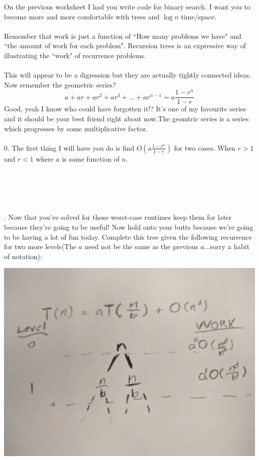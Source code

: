\documentclass[12pt]{article}
\begin{document}
\newpage
\noindent On the previous worksheet I had you write code for binary search. I want you to become more and more comfortable with trees and $\log{n}$ time/space. \\\\
Remember that work is just a function of ``How many problems we have" and ``the amount of work for each problem". Recursion trees is an expressive way of illustrating the ``work" of recurrence problems.\\\\
This will appear to be a digression but they are actually tightly connected ideas. Now remember the geometric series?
$$a + ar + ar^2+ar^3+\dots + ar^{n-1} = a\frac{1-r^n}{1-r}$$
Good, yeah I know who could have forgotten it!? It's one of my favourite series and it should be your best friend right about now.The geomtric series is a series which progresses by some multiplicative factor. \\\\
0. The first thing I will have you do is find $O(a\frac{1-r^{n}}{1-r})$ for two cases. When $r>1$ and $r<1$ where $a$ is some function of $n$.\\\\\\\\\\\\
\newpage
{}. Now that you've solved for those worst-case runtimes keep them for later because they're going to be useful! Now hold onto your butts because we're going to be having a lot of fun today. Complete this tree given the following recurrence for two more levels(The $a$ need not be the same as the previous $a$...sorry a habit of notation):\\
\centerline{\includegraphics[scale = 0.05]{tree.jpg}} 
\end{document}
